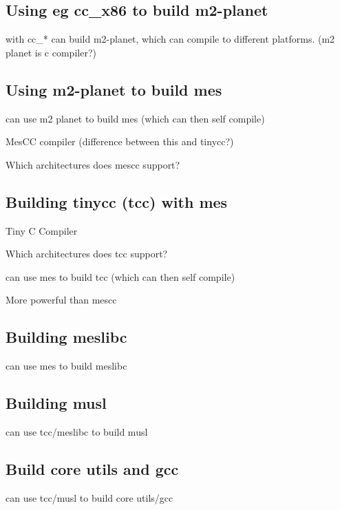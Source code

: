 
\subsection{Using eg cc\_x86 to build m2-planet}

with cc\_* can build m2-planet, which can compile to different platforms. (m2 planet is c compiler?)

\subsection{Using m2-planet to build mes}

can use m2 planet to build mes (which can then self compile)

MesCC compiler (difference between this and tinycc?)

Which architectures does mescc support?

\subsection{Building tinycc (tcc) with mes}

Tiny C Compiler

Which architectures does tcc support?

can use mes to build tcc (which can then self compile)

More powerful than mescc

\subsection{Building meslibc}

can use mes to build meslibc

\subsection{Building musl}

can use tcc/meslibc to build musl

\subsection{Build core utils and gcc}

can use tcc/musl to build core utils/gcc



